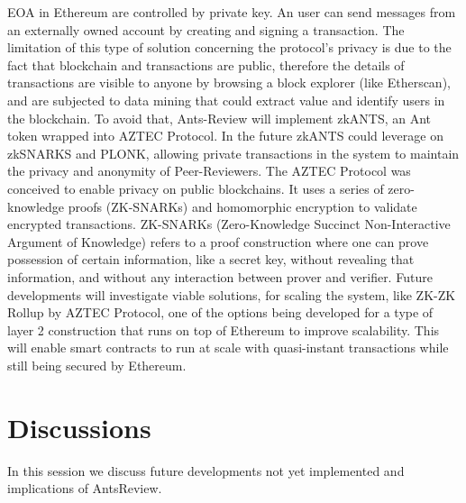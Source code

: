 \documentclass[runningheads]{llncs}
\begin{document}
EOA in Ethereum are controlled by private key. An user can send messages from an externally owned account by creating and signing a transaction. The limitation of this type of solution concerning the protocol's privacy is due to the fact that blockchain and transactions are public, therefore the details of transactions are visible to anyone by browsing a block explorer (like Etherscan), and are subjected to data mining that could extract value and identify users in the blockchain.
\newline To avoid that, Ants-Review will implement zkANTS, an Ant token wrapped into AZTEC Protocol. In the future zkANTS could leverage on zkSNARKS and PLONK, allowing private transactions in the system to maintain the privacy and anonymity of Peer-Reviewers.
\newline The AZTEC Protocol was conceived to enable privacy on public blockchains. It uses a series of zero-knowledge proofs (ZK-SNARKs) and homomorphic encryption to validate encrypted transactions.
\newline ZK-SNARKs (Zero-Knowledge Succinct Non-Interactive Argument of Knowledge) \cite{ZKSNARKs} refers to a proof construction where one can prove possession of certain information, like a secret key, without revealing that information, and without any interaction between prover and verifier.
\newline Future developments will investigate viable solutions, for scaling the system, like ZK-ZK Rollup by AZTEC Protocol, one of the options being developed for a type of layer 2 construction that runs on top of Ethereum to improve scalability. This will enable smart contracts to run  at scale with quasi-instant transactions while still being secured by Ethereum.

\section{Discussions}
In this session we discuss future developments not yet implemented and implications of AntsReview.
\end{document}
